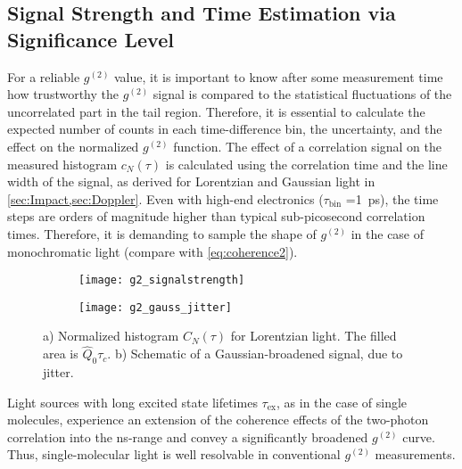 \subsection{Signal Strength and Time Estimation via Significance Level}\label{sec:Timeestimation}
For a reliable $g^{(2)}$ value, it is important to know after some measurement time how trustworthy the $g^{(2)}$ signal is compared to the statistical fluctuations of the uncorrelated part in the tail region. Therefore, it is essential to calculate the expected number of counts in each time-difference bin, the uncertainty, and the effect on the normalized $g^{(2)}$ function.
The effect of a correlation signal on the measured histogram $c_N(\tau)$ is calculated using the correlation time and the line width of the signal, as derived for Lorentzian and Gaussian light in \cref{sec:Impact,sec:Doppler}. Even with high-end electronics ($\tau_\mathrm{bin}$ =\SI{1}{\ps}), the time steps are orders of magnitude higher than typical sub-picosecond correlation times. Therefore, it is demanding to sample the shape of $g^{(2)}$ in the case of monochromatic light (compare with \cref{eq:coherence2}).
\begin{figure}[htp]
	\centering
	\begin{subfigure}{0.49\linewidth}
		\centering
		\texttt{[image: g2\_signalstrength]}
		\caption{}
		\label{fig:Signalstrength}
	\end{subfigure}
	\hfill
	\begin{subfigure}{0.485\linewidth}
		\centering
		\texttt{[image: g2\_gauss\_jitter]}
		\caption{}
		\label{fig:Gaussjitter}
	\end{subfigure}
	\caption{a) Normalized histogram $C_N(\tau)$ for Lorentzian light. The filled area is $\hat{Q}_0\tau_c$. b) Schematic of a Gaussian-broadened signal, due to jitter.}
\end{figure}
\noindent Light sources with long excited state lifetimes $\tau_\mathrm{ex}$, as in the case of single molecules, experience an extension of the coherence effects of the two-photon correlation into the \si{ns}-range and convey a significantly broadened $g^{(2)}$ curve. Thus, single-molecular light is well resolvable in conventional $g^{(2)}$ measurements.\\
